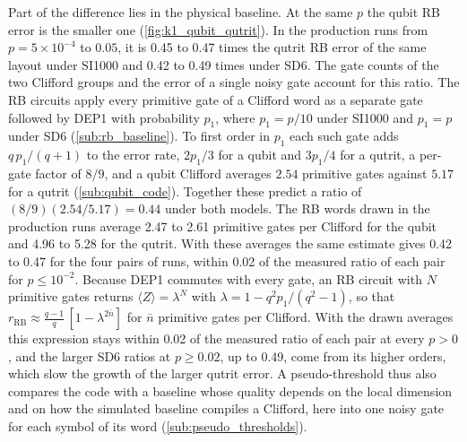 Part of the difference lies in the physical baseline. At the same $p$ the qubit RB error is the smaller one (\autoref{fig:k1_qubit_qutrit}). In the production runs from $p = 5\times10^{-4}$ to $0.05$, it is 0.45 to 0.47 times the qutrit RB error of the same layout under SI1000 and 0.42 to 0.49 times under SD6. The gate counts of the two Clifford groups and the error of a single noisy gate account for this ratio. The RB circuits apply every primitive gate of a Clifford word as a separate gate followed by DEP1 with probability $p_1$, where $p_1 = p/10$ under SI1000 and $p_1 = p$ under SD6 (\autoref{sub:rb_baseline}). To first order in $p_1$ each such gate adds $q\,p_1/(q+1)$ to the error rate, $2p_1/3$ for a qubit and $3p_1/4$ for a qutrit, a per-gate factor of $8/9$, and a qubit Clifford averages $2.54$ primitive gates against $5.17$ for a qutrit (\autoref{sub:qubit_code}). Together these predict a ratio of $(8/9)(2.54/5.17) = 0.44$ under both models. The RB words drawn in the production runs average 2.47 to 2.61 primitive gates per Clifford for the qubit and 4.96 to 5.28 for the qutrit. With these averages the same estimate gives 0.42 to 0.47 for the four pairs of runs, within 0.02 of the measured ratio of each pair for $p \le 10^{-2}$. Because DEP1 commutes with every gate, an RB circuit with $N$ primitive gates returns $\langle Z \rangle = \lambda^N$ with $\lambda = 1 - q^2 p_1/(q^2-1)$, so that $r_{\mathrm{RB}} \approx \tfrac{q-1}{q}\,[1 - \lambda^{2\bar n}]$ for $\bar n$ primitive gates per Clifford. With the drawn averages this expression stays within 0.02 of the measured ratio of each pair at every $p > 0$, and the larger SD6 ratios at $p \ge 0.02$, up to 0.49, come from its higher orders, which slow the growth of the larger qutrit error. A pseudo-threshold thus also compares the code with a baseline whose quality depends on the local dimension and on how the simulated baseline compiles a Clifford, here into one noisy gate for each symbol of its word (\autoref{sub:pseudo_thresholds}).

